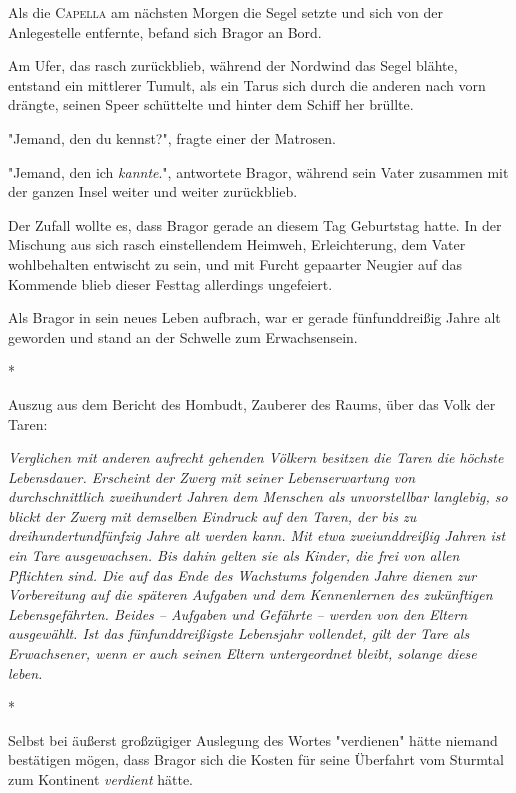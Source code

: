 \documentclass[10pt, a4paper, oneside]{book}
\begin{document}
\begin{multicols}{2}
Als die \textsc{Capella} am nächsten Morgen die Segel setzte und sich von der Anlegestelle entfernte, befand sich Bragor an Bord. 

Am Ufer, das rasch zurückblieb, während der Nordwind das Segel blähte, entstand ein mittlerer Tumult, als ein Tarus sich durch die anderen nach vorn drängte, seinen Speer schüttelte und hinter dem Schiff her brüllte. 

"Jemand, den du kennst?", fragte einer der Matrosen. 

"Jemand, den ich \textit{kannte}.", antwortete Bragor, während sein Vater zusammen mit der ganzen Insel weiter und weiter zurückblieb. 

Der Zufall wollte es, dass Bragor gerade an diesem Tag Geburtstag hatte. In der Mischung aus sich rasch einstellendem Heimweh, Erleichterung, dem Vater wohlbehalten entwischt zu sein, und mit Furcht gepaarter Neugier auf das Kommende blieb dieser Festtag allerdings ungefeiert. 

Als Bragor in sein neues Leben aufbrach, war er gerade fünfunddreißig Jahre alt geworden und stand an der Schwelle zum Erwachsensein. 

\begin{center}
    *
\end{center}

Auszug aus dem Bericht des Hombudt, Zauberer des Raums, über das Volk der 
Taren: 

\textit{Verglichen mit anderen aufrecht gehenden Völkern besitzen die Taren die höchste Lebensdauer. Erscheint der Zwerg mit seiner Lebenserwartung von durchschnittlich zweihundert Jahren dem Menschen als unvorstellbar langlebig, so blickt der Zwerg mit demselben Eindruck auf den Taren, der bis zu dreihundertundfünfzig Jahre alt werden kann. Mit etwa zweiunddreißig Jahren ist ein Tare ausgewachsen. Bis dahin gelten sie als Kinder, die frei von allen Pflichten sind. Die auf das Ende des Wachstums folgenden Jahre dienen zur Vorbereitung auf die späteren Aufgaben und dem Kennenlernen des zukünftigen Lebensgefährten. Beides – Aufgaben und Gefährte – werden von den Eltern ausgewählt. Ist das fünfunddreißigste Lebensjahr vollendet, gilt der Tare als Erwachsener, wenn er auch seinen Eltern untergeordnet bleibt, solange diese leben. }

\begin{center}
    *
\end{center}

Selbst bei äußerst großzügiger Auslegung des Wortes "verdienen" hätte 
niemand bestätigen mögen, dass Bragor sich die Kosten für seine Überfahrt vom Sturmtal zum Kontinent \textit{verdient} hätte. 


\end{multicols}
\end{document}
